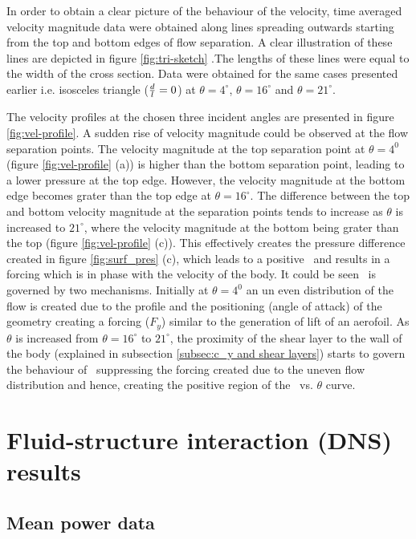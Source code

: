 In order to obtain a clear picture of the behaviour of the velocity, time averaged velocity magnitude data were obtained along lines spreading outwards starting from the top and bottom edges of flow separation. A clear illustration of these lines are depicted in figure \ref{fig:tri-sketch} .The lengths of these lines were equal to the width of the cross section. Data were obtained for the same cases presented earlier i.e. isosceles triangle ($\frac{d}{l}=0$) at $\theta=4^{\circ}$, $\theta=16^{\circ}$ and $\theta=21^{\circ}$.



The velocity profiles at the chosen three incident angles are presented in figure \ref{fig:vel-profile}. A sudden rise of velocity magnitude could be observed at the flow separation points. The velocity magnitude at the top separation point  at $\theta= 4^{0}$ (figure \ref{fig:vel-profile} (a)) is higher than the bottom separation point, leading to a lower pressure at the top edge. However, the velocity magnitude at the bottom edge becomes grater than the top edge at $\theta=16^{\circ}$. The difference between the top and bottom velocity magnitude at the separation points tends to increase as $\theta$ is increased to $21^{\circ}$, where the velocity magnitude at the bottom being grater than the top (figure \ref{fig:vel-profile} (c)). This effectively creates the pressure difference created in figure \ref{fig:surf_pres} (c), which leads to a positive \cy\ and results in a forcing which is in phase with the velocity of the body. It could be seen \cy\ is governed by two mechanisms. Initially at $\theta= 4^{0}$ an un even distribution of the flow is created due to the profile and the positioning (angle of attack) of the geometry creating a forcing ($F_{y}$) similar to the generation of lift of an aerofoil.
As $\theta$ is increased from $\theta=16^{\circ}$ to $21^{\circ}$, the proximity of the shear layer to the wall of the body (explained in subsection \ref{subsec:c_y and shear layers}) starts to govern the behaviour of \cy\ suppressing the forcing created due to the uneven flow distribution and hence, creating the positive region of the \cy\ vs. $\theta$ curve. 


\section{Fluid-structure interaction (DNS) results}
\label{sec:cross-sec-FSI-results}

\subsection{Mean power data}
\label{subsec:cross-sec-dns-mean-power}

